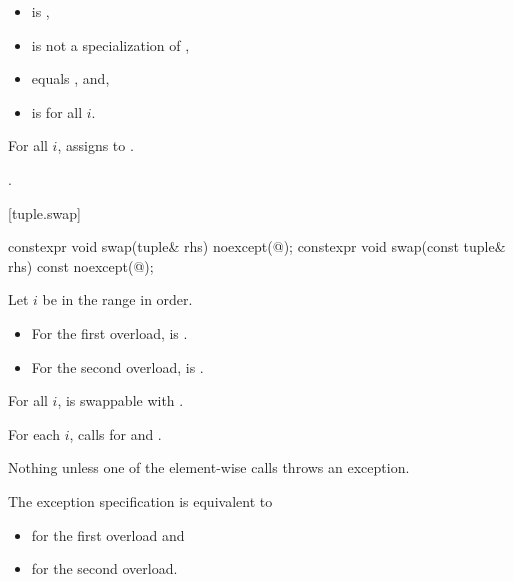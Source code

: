 \begin{itemdescr}
\pnum
\constraints
\begin{itemize}
\item
{}
is ,

\item
{}
is not a specialization of ,

\item
{}
equals , and,

\item
{}
is  for all $i$.
\end{itemize}

\pnum
\effects
For all $i$, assigns
 to .

\pnum
\returns
{}.
\end{itemdescr}

[tuple.swap]{}

%
\begin{itemdecl}
constexpr void swap(tuple& rhs) noexcept(@\seebelow@);
constexpr void swap(const tuple& rhs) const noexcept(@\seebelow@);
\end{itemdecl}

\begin{itemdescr}
\pnum
Let $i$ be in the range  in order.

\pnum
\mandates
\begin{itemize}
\item
For the first overload,
 is .
\item
For the second overload,
 is .
\end{itemize}

\pnum
\expects
For all $i$,  is swappable with .

\pnum
\effects
For each $i$, calls  for  and .

\pnum
\throws
Nothing unless one of the element-wise  calls throws an exception.

\pnum
\remarks
The exception specification is equivalent to
\begin{itemize}
\item
{} for the first overload and
\item
{} for the second overload.
\end{itemize}
\end{itemdescr}

